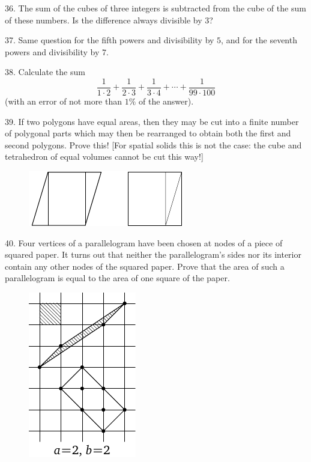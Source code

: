 \begin{problem}{36.}
	The sum of the cubes of three integers is subtracted from the cube of the sum of these numbers. Is the difference always divisible by $3$?
\end{problem}

\begin{problem}{37.}
	Same question for the fifth powers and divisibility by $5$, and for the seventh powers and divisibility by $7$.
\end{problem}

\begin{problem}{38.}
	Calculate the sum
	\begin{equation*}
		\frac{1}{1\cdot 2} + \frac{1}{2\cdot 3} + \frac{1}{3\cdot 4} + \dotsb + \frac{1}{99\cdot 100}
	\end{equation*}
	(with an error of not more than $1\%$ of the answer).
\end{problem}

\begin{problem}{39.}
	If two polygons have equal areas, then they may be cut into a finite number of polygonal parts which may then be rearranged to obtain both the first and second polygons. Prove this! [For spatial solids this is not the case: the cube and tetrahedron of equal volumes cannot be cut this way!]
	\begin{figure}
		\includegraphics{resources/q39_horizontal}
	\end{figure}
\end{problem}

\begin{problem}{40.}
	Four vertices of a parallelogram have been chosen at nodes of a piece of squared paper. It turns out that neither the parallelogram's sides nor its interior contain any other nodes of the squared paper. Prove that the area of such a parallelogram is equal to the area of one square of the paper.
	\begin{figure}
		\includegraphics{resources/taskbook-24}
	\end{figure}
\end{problem}

